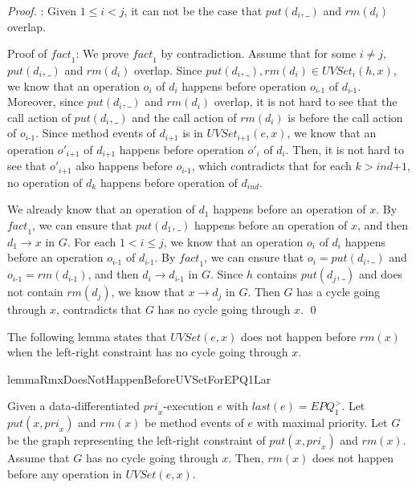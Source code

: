 \begin {proof}
: Given $1 \leq i < j$, it can not be the case that $\textit{put}(d_i,\_)$ and $\textit{rm}(d_i)$ overlap.

Proof of $\textit{fact}_1$: We prove $\textit{fact}_1$ by contradiction. Assume that for some $i \neq j$, $\textit{put}(d_i,\_)$ and $\textit{rm}(d_i)$ overlap. Since $\textit{put}(d_i,\_), \textit{rm}(d_i) \in \textit{UVSet}_i(h,x)$, we know that an operation $o_i$ of $d_i$ happens before operation $o_{\textit{i-1}}$ of $d_{\textit{i-1}}$. Moreover, since $\textit{put}(d_i,\_)$ and $\textit{rm}(d_i)$ overlap, it is not hard to see that the call action of $\textit{put}(d_i,\_)$ and the call action of $\textit{rm}(d_i)$ is before the call action of $o_{\textit{i-1}}$. Since method events of $d_{\textit{i+1}}$ is in $\textit{UVSet}_{\textit{i+1}}(e,x)$, we know that an operation $o'_{\textit{i+1}}$ of $d_{\textit{i+1}}$ happens before operation $o'_i$ of $d_i$. Then, it is not hard to see that $o'_{\textit{i+1}}$ also happens before $o_{\textit{i-1}}$, which contradicts that for each $k > \textit{ind+1}$, no operation of $d_k$ happens before operation of $d_{\textit{ind}}$.

We already know that an operation of $d_1$ happens before an operation of $x$. By $\textit{fact}_1$, we can ensure that $\textit{put}(d_1,\_)$ happens before an operation of $x$, and then $d_1 \rightarrow x$ in $G$. For each $1 < i \leq j$, we know that an operation $o_i$ of $d_i$ happens before an operation $o_{\textit{i-1}}$ of $d_{\textit{i-1}}$. By $\textit{fact}_1$, we can ensure that $o_i=\textit{put}(d_i,\_)$ and $o_{\textit{i-1}}=\textit{rm}(d_{\textit{i-1}})$, and then $d_i \rightarrow d_{\textit{i-1}}$ in $G$. Since $h$ contains $\textit{put}(d_j,\_)$ and does not contain $\textit{rm}(d_j)$, we know that $x \rightarrow d_j$ in $G$. Then $G$ has a cycle going through $x$, contradicts that $G$ has no cycle going through $x$. \qed
\end {proof}


The following lemma states that $\textit{UVSet}(e,x)$ does not happen before $\textit{rm}(x)$ when the left-right constraint has no cycle going through $x$.

\begin{restatable}{lemma}{RmxDoesNotHappenBeforeUVSetForEPQ1Lar}
\label{lemma:Rmx does not happen before UVSet for EPQ1Lar}

Given a data-differentiated $\textit{pri}_x$-execution $e$ with $\textit{last}(e) = \textit{EPQ}_1^{>}$. Let $\textit{put}(x,\textit{pri}_x)$ and $\textit{rm}(x)$ be method events of $e$ with maximal priority. Let $G$ be the graph representing the left-right constraint of $\textit{put}(x,\textit{pri}_x)$ and $\textit{rm}(x)$. Assume that $G$ has no cycle going through $x$. Then, $\textit{rm}(x)$ does not happen before any operation in $\textit{UVSet}(e,x)$.
\end{restatable}

